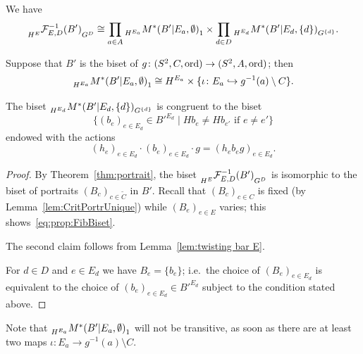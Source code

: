 \documentclass{amsart}
\newcommand\Forget{{\mathcal F}}
\newcommand\wtC{{\widetilde C}}
\begin{document}
\begin{prop}\label{prop:FibBiset}
  We have
  \begin{equation}\label{eq:prop:FibBiset}
    \subscript{H^E}{ \Forget_{E,D}^{-1}(B')}_{G^D}\cong \prod_{a\in A} \subscript{H^{E_a}} {M^*( B'| E_a,\emptyset )}_1\times \prod_{d\in D}\subscript{H^{E_d}} {M^*( B'| E_d,\{d\})}_{G^{\{d\}}}.
  \end{equation}

  Suppose that $B'$ is the biset of $g\colon (S^2,C,\operatorname{ord})\to (S^2,A,\operatorname{ord})$; then
  \[\subscript{H^{E_a}} {M^*( B'| E_a,\emptyset )}_1\cong H^{E_a}\times\{\iota\colon E_a\hookrightarrow  g^{-1}(a)\setminus C\}.\]

  The biset
  $\subscript{H^{E_d}} {M^*( B'| E_d,\{d\})}_{G^{\{d\}}}$ is
  congruent to the biset
  \[\{(b_e)_{e\in E_d}\in B'^{E_d}\mid H b_e\neq H b_{e'}\text{ if }e\neq e'\}\]
  endowed with the actions
 \[(h_e)_{e\in E_d}\cdot (b_e)_{e\in E_d}\cdot g= (h_e b_e g)_{e\in E_d}.\]
\end{prop}
\begin{proof}
  By Theorem~\ref{thm:portrait}, the biset
  $\subscript{H^E}{ \Forget_{E,D}^{-1}(B')}_{G^D}$ is isomorphic to
  the biset of portraits $(B_c)_{c\in \wtC}$ in $B'$. Recall
  that $(B_c)_{c\in C}$ is fixed (by Lemma~\ref{lem:CritPortrUnique})
  while $(B_e)_{e\in E}$ varies; this
  shows~\eqref{eq:prop:FibBiset}.

  The second claim follows from Lemma~\ref{lem:twisting bar E}.

  For $d\in D$ and $e\in E_d$ we have $B_e=\{b_e\}$; i.e.~the choice
  of $(B_e)_{e\in E_d}$ is equivalent to the choice of
  $(b_e)_{e\in E_d}\in B'^{E_d}$ subject to the condition stated above.
\end{proof}

Note that $\subscript{H^{E_a}} {M^*( B'| E_a,\emptyset )}_1$ will not
be transitive, as soon as there are at least two maps
$\iota\colon E_a\to g^{-1}(a)\setminus C$.
\end{document}
